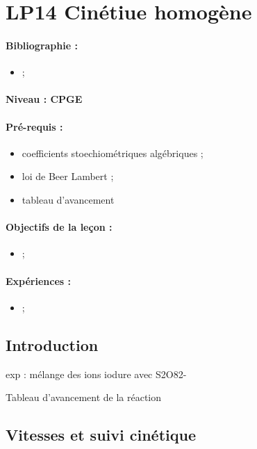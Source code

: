 \section{LP14 Cinétiue homogène}

\paragraph{Bibliographie :}
\begin{itemize}
\item ;
\end{itemize}

\paragraph{Niveau : CPGE}

\paragraph{Pré-requis :}
\begin{itemize}
\item coefficients stoechiométriques algébriques ;
\item loi de Beer Lambert ;
\item tableau d'avancement
\end{itemize}

\paragraph{Objectifs de la leçon :}
\begin{itemize}
\item ;
\end{itemize}

\paragraph{Expériences :}
\begin{itemize}
\item ;
\end{itemize}

\subsection{Introduction}

exp : mélange des ions iodure avec S2O82-

Tableau d'avancement de la réaction

\subsection{Vitesses et suivi cinétique}

